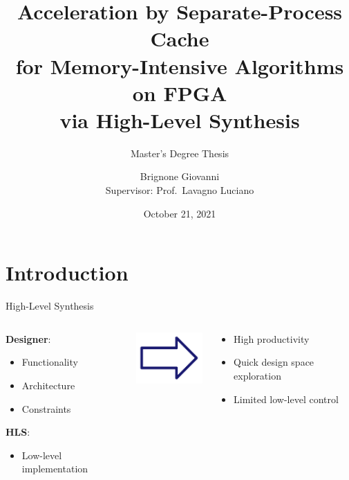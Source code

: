 \documentclass[aspectratio=169]{beamer}
\title{Acceleration by Separate-Process Cache\\for Memory-Intensive Algorithms
on FPGA\\via High-Level Synthesis}
\subtitle{Master's Degree Thesis}
\author{Brignone Giovanni \\ \tiny{Supervisor:} \small{Prof.\ Lavagno Luciano}}
\institute{Politecnico di Torino}
\date{October 21, 2021}
\begin{document}
\begin{frame}
	\maketitle
\end{frame}


\section{Introduction}
\begin{frame}{High-Level Synthesis}
	\begin{columns}
		\begin{column}{.45\textwidth}
			\textbf{Designer}:
			\begin{itemize}
				\item Functionality
				\item Architecture
				\item Constraints
			\end{itemize}
			\textbf{HLS}:
			\begin{itemize}
				\item Low-level implementation
			\end{itemize}
		\end{column}
		\begin{column}{.05\textwidth}
		\includegraphics[width=\textwidth]{arrow}
		\end{column}
		\begin{column}{.45\textwidth}
			\begin{itemize}
				\item High productivity
				\item Quick design space exploration
				\item Limited low-level control
			\end{itemize}
		\end{column}
	\end{columns}
\end{frame}
\end{document}

